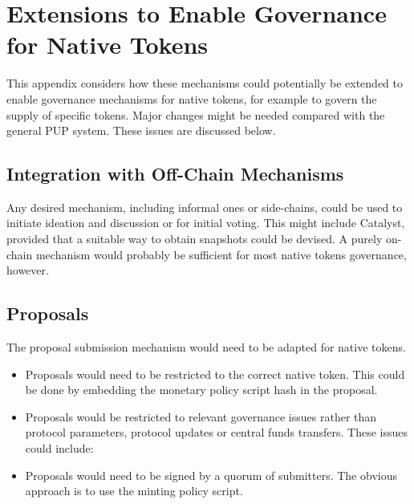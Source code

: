 \pagebreak
\section{Extensions to Enable Governance for Native Tokens}
\label{sect:native-tokens}

This appendix considers how these mechanisms could potentially be extended to enable
governance mechanisms for native tokens, for example to govern the supply of specific tokens.
Major changes might be needed compared with the general PUP system.  These issues are discussed below.

\subsection{Integration with Off-Chain Mechanisms}

Any desired mechanism, including informal ones or side-chains, could be used to initiate ideation and discussion or for
initial voting.  This might include Catalyst, provided that a suitable way to obtain snapshots could be devised.
A purely on-chain mechanism would probably be sufficient for most native tokens governance, however.

\subsection{Proposals}

The proposal submission mechanism would need to be adapted for native tokens.

\begin{itemize}
\item
  Proposals would need to be restricted to the correct native token.  This could be done by embedding the monetary policy script hash in the proposal.
\item
  Proposals would be restricted to relevant governance issues rather than protocol parameters, protocol updates or central funds transfers.
  These issues could include:
\item
  Proposals would need to be signed by a quorum of submitters.  The obvious approach is to use the minting policy script.
\end{itemize}


